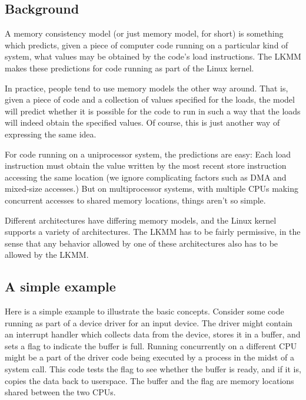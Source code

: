 \subsection{Background}
\label{sec:docs:explanation:Background}

A memory consistency model (or just memory model, for short) is
something which predicts, given a piece of computer code running on a
particular kind of system, what values may be obtained by the code's
load instructions.
The LKMM makes these predictions for code running as part of the Linux
kernel.

In practice, people tend to use memory models the other way around.
That is, given a piece of code and a collection of values specified
for the loads, the model will predict whether it is possible for the
code to run in such a way that the loads will indeed obtain the
specified values.
Of course, this is just another way of expressing the same idea.

For code running on a uniprocessor system, the predictions are easy:
Each load instruction must obtain the value written by the most recent
store instruction accessing the same location (we ignore complicating
factors such as DMA and mixed-size accesses.)
But on multiprocessor systems, with multiple CPUs making concurrent
accesses to shared memory locations, things aren't so simple.

Different architectures have differing memory models, and the Linux
kernel supports a variety of architectures.
The LKMM has to be fairly permissive, in the sense that any behavior
allowed by one of these architectures also has to be allowed by the LKMM\@.


\subsection{A simple example}
\label{sec:docs:explanation:A Simple Example}

Here is a simple example to illustrate the basic concepts.
Consider some code running as part of a device driver for an input device.
The driver might contain an interrupt handler which collects data from the
device, stores it in a buffer, and sets a flag to indicate the buffer
is full.
Running concurrently on a different CPU might be a part of the driver
code being executed by a process in the midst of a 
system call.
This code tests the flag to see whether the buffer is ready, and if it is,
copies the data back to userspace.
The buffer and the flag are memory locations shared between the two CPUs.

